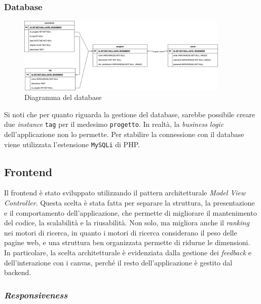 \subsubsection{Database}

\begin{figure}[H]
	\centering
	\includegraphics[width=0.9\textwidth]{figures/Database.png}
	\caption{Diagramma del database}
\end{figure}

Si noti che per quanto riguarda la gestione del database, sarebbe possibile
creare due \textit{instance} \texttt{tag} per il medesimo \texttt{progetto}. In 
realtà, la \textit{business logic} dell'applicazione non lo permette.
Per stabilire la connessione con il database viene utilizzata l'estensione
\texttt{MySQLi} di PHP.

\subsection{Frontend}

Il frontend è stato sviluppato utilizzando il pattern architetturale
\textit{Model View Controller}. Questa scelta è stata fatta per separare la
struttura, la presentazione e il comportamento dell'applicazione, che permette 
di migliorare il mantenimento del
codice, la scalabilità e la riusabilità. Non solo, ma migliora anche il
\textit{ranking} nei motori di ricerca, in quanto i motori di ricerca
considerano il peso delle pagine web, e una struttura ben organizzata permette
di ridurne le dimensioni.\\
In particolare, la scelta architetturale è evidenziata dalla gestione dei
\textit{feedback} e dell'interazione con i canvas, perché il resto
dell'applicazione è gestito dal backend.

\subsubsection{\textit{Responsiveness}}

